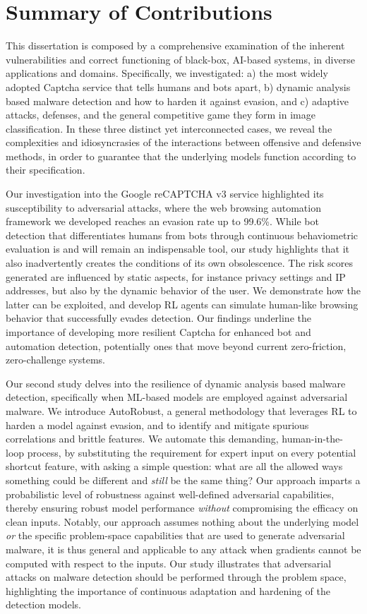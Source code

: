 \section{Summary of Contributions}
This dissertation is composed by a comprehensive examination of the inherent vulnerabilities and correct functioning of black-box, AI-based systems, in diverse applications and domains.
Specifically, we investigated: a) the most widely adopted Captcha service that tells humans and bots apart, b) dynamic analysis based malware detection and how to harden it against evasion, and c) adaptive attacks, defenses, and the general competitive game they form in image classification.
In these three distinct yet interconnected cases, we reveal the complexities and idiosyncrasies of the interactions between offensive and defensive methods, in order to guarantee that the underlying models function according to their specification.

Our investigation into the Google reCAPTCHA v3 service highlighted its susceptibility to adversarial attacks, where the web browsing automation framework we developed reaches an evasion rate up to 99.6\%.
While bot detection that differentiates humans from bots through continuous behaviometric evaluation is and will remain an indispensable tool, our study highlights that it also inadvertently creates the conditions of its own obsolescence.
The risk scores generated are influenced by static aspects, for instance privacy settings and IP addresses, but also by the dynamic behavior of the user.
We demonstrate how the latter can be exploited, and develop \gls{RL} agents can simulate human-like browsing behavior that successfully evades detection.
Our findings underline the importance of developing more resilient Captcha for enhanced bot and automation detection, potentially ones that move beyond current zero-friction, zero-challenge systems.

Our second study delves into the resilience of dynamic analysis based malware detection, specifically when ML-based models are employed against adversarial malware.
We introduce AutoRobust, a general methodology that leverages \gls{RL} to harden a model against evasion, and to identify and mitigate spurious correlations and brittle features.
We automate this demanding, human-in-the-loop process, by substituting the requirement for expert input on every potential shortcut feature, with asking a simple question: what are all the allowed ways something could be different and \textit{still} be the same thing?
Our approach imparts a probabilistic level of robustness against well-defined adversarial capabilities, thereby ensuring robust model performance \textit{without} compromising the efficacy on clean inputs.
Notably, our approach assumes nothing about the underlying model \textit{or} the specific problem-space capabilities that are used to generate adversarial malware, it is thus general and applicable to any attack when gradients cannot be computed with respect to the inputs.
Our study illustrates that adversarial attacks on malware detection should be performed through the problem space, highlighting the importance of continuous adaptation and hardening of the detection models.

